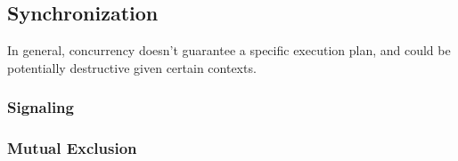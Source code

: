 \documentclass[12pt,a4paper,teal]{bbe}
\begin{document}
	
	\subsection{Synchronization}
	In general, concurrency doesn't guarantee a specific execution plan, and could
	be potentially destructive given certain contexts. 
	\subsubsection{Signaling}
	\subsubsection{Mutual Exclusion}
	
\end{document}
